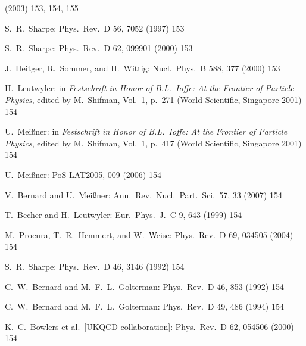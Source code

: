 \begin{enumerate}[label={[\arabic*]}]
        (2003) 153, 154, 155
  \item S.~R.~Sharpe: Phys.\ Rev.\ D 56, 7052 (1997) 153
  \item S.~R.~Sharpe: Phys.\ Rev.\ D 62, 099901 (2000) 153
  \item J.~Heitger, R.~Sommer, and H.~Wittig: Nucl.\ Phys.\ B 588, 377 (2000)
        153
  \item H.~Leutwyler: in \emph{Festschrift in Honor of B.L.~Ioffe: At the
        Frontier of Particle Physics}, edited by M.~Shifman, Vol.~1, p.~271
        (World Scientific, Singapore 2001) 154
  \item U.~Mei\ss ner: in \emph{Festschrift in Honor of B.L.~Ioffe: At the
        Frontier of Particle Physics}, edited by M.~Shifman, Vol.~1, p.~417
        (World Scientific, Singapore 2001) 154
  \item U.~Mei\ss ner: PoS LAT2005, 009 (2006) 154
  \item V.~Bernard and U.~Mei\ss ner: Ann.\ Rev.\ Nucl.\ Part.\ Sci.\ 57, 33
        (2007) 154
  \item T.~Becher and H.~Leutwyler: Eur.\ Phys.\ J.\ C 9, 643 (1999) 154
  \item M.~Procura, T.~R.~Hemmert, and W.~Weise: Phys.\ Rev.\ D 69, 034505
        (2004) 154
  \item S.~R.~Sharpe: Phys.\ Rev.\ D 46, 3146 (1992) 154
  \item C.~W.~Bernard and M.~F.~L.~Golterman: Phys.\ Rev.\ D 46, 853 (1992) 154
  \item C.~W.~Bernard and M.~F.~L.~Golterman: Phys.\ Rev.\ D 49, 486 (1994) 154
  \item K.~C.~Bowlers et al.\ [UKQCD collaboration]: Phys.\ Rev.\ D 62, 054506
        (2000) 154
\end{enumerate}
